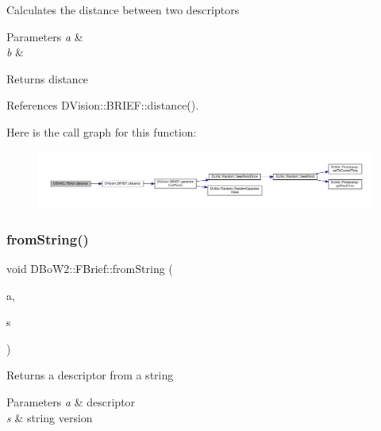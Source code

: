 Calculates the distance between two descriptors 
\begin{DoxyParams}{Parameters}
{\em a} & \\
\hline
{\em b} & \\
\hline
\end{DoxyParams}
\begin{DoxyReturn}{Returns}
distance 
\end{DoxyReturn}


References D\+Vision\+::\+B\+R\+I\+E\+F\+::distance().

Here is the call graph for this function\+:\nopagebreak
\begin{figure}[H]
\begin{center}
\leavevmode
\includegraphics[width=350pt]{classDBoW2_1_1FBrief_adc1c516cc0a2c9847853653956e8c35a_cgraph}
\end{center}
\end{figure}
\mbox{\label{classDBoW2_1_1FBrief_a05bb35b06cc95b41edc80640ef2ea9f5}} 
\subsubsection{\texorpdfstring{from\+String()}{fromString()}}
{\footnotesize\ttfamily void D\+Bo\+W2\+::\+F\+Brief\+::from\+String (\begin{DoxyParamCaption}\item[{F\+Brief\+::\+T\+Descriptor \&}]{a,  }\item[{const std\+::string \&}]{s }\end{DoxyParamCaption})\hspace{0.3cm}{\ttfamily [static]}}

Returns a descriptor from a string 
\begin{DoxyParams}{Parameters}
{\em a} & descriptor \\
\hline
{\em s} & string version \\
\hline
\end{DoxyParams}
\mbox{\label{classDBoW2_1_1FBrief_a2808910daf6af046b47925715d71b564}} 
